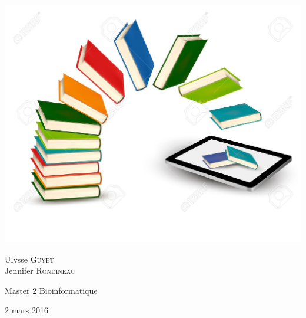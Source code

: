 \begin{titlepage}
\begin{sffamily}
\begin{center}
    
    \includegraphics[scale=0.8]{image.jpg}
      \vfill
      \begin{center} \large
       Ulysse \textsc{Guyet}\\
       Jennifer \textsc{Rondineau}\\
       \end{center}
       \begin{center} \large
       Master 2 Bioinformatique \\
       \end{center}
      

   

    {\large 2 mars 2016}

  \end{center}
  \end{sffamily}
\end{titlepage}
